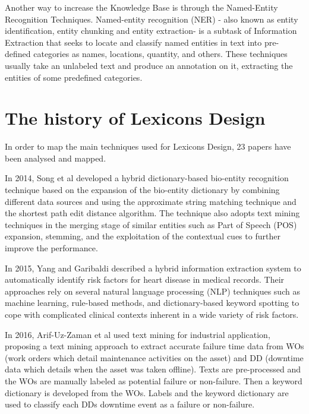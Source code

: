 \documentclass[b5paper,]{book}
\theoremstyle{definition}
\theoremstyle{definition}
\theoremstyle{definition}
\theoremstyle{remark}
\begin{document}
Another way to increase the Knowledge Base is through the Named-Entity
Recognition Techniques. Named-entity recognition (NER) - also known as
entity identification, entity chunking and entity extraction- is a
subtask of Information Extraction that seeks to locate and classify
named entities in text into pre-defined categories as names, locations,
quantity, and others. These techniques usually take an unlabeled text
and produce an annotation on it, extracting the entities of some
predefined categories.

\section{The history of Lexicons
Design}\label{the-history-of-lexicons-design}

In order to map the main techniques used for Lexicons Design, 23 papers
have been analysed and mapped.

In 2014, Song et al \citep{song2015developing} developed a hybrid
dictionary-based bio-entity recognition technique based on the expansion
of the bio-entity dictionary by combining different data sources and
using the approximate string matching technique and the shortest path
edit distance algorithm. The technique also adopts text mining
techniques in the merging stage of similar entities such as Part of
Speech (POS) expansion, stemming, and the exploitation of the contextual
cues to further improve the performance.

In 2015, Yang and Garibaldi \citep{yang2015hybrid} described a hybrid
information extraction system to automatically identify risk factors for
heart disease in medical records. Their approaches rely on several
natural language processing (NLP) techniques such as machine learning,
rule-based methods, and dictionary-based keyword spotting to cope with
complicated clinical contexts inherent in a wide variety of risk
factors.

In 2016, Arif-Uz-Zaman et al \citep{arif2017extracting} used text mining
for industrial application, proposing a text mining approach to extract
accurate failure time data from WOs (work orders which detail
maintenance activities on the asset) and DD (downtime data which details
when the asset was taken offline). Texts are pre-processed and the WOs
are manually labeled as potential failure or non-failure. Then a keyword
dictionary is developed from the WOs. Labels and the keyword dictionary
are used to classify each DDs downtime event as a failure or
non-failure.
\end{document}
